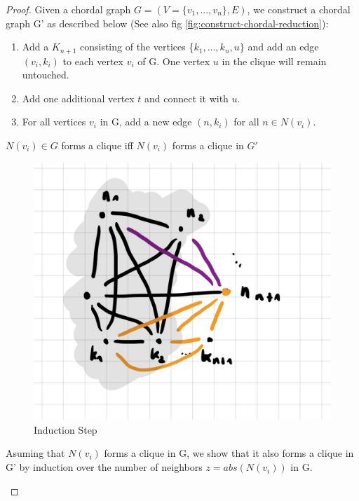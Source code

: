\begin{proof}
    

    Given a chordal graph $G = (V = \{v_1,...,v_n\}, E)$, we construct a chordal graph G' as described below (See also fig \ref{fig:construct-chordal-reduction}):
    \begin{enumerate}
        \item Add a $K_{n+1}$ consisting of the vertices \{$k_1,...,k_n,u\}$ and add an edge $(v_i, k_i)$ to each vertex $v_i$ of G. One vertex $u$ in the clique will remain untouched.
        \item Add one additional vertex $t$ and connect it with $u$.
        \item For all vertices $v_i$ in G, add a new edge $(n, k_i)$ for all $n \in N(v_i)$.
    \end{enumerate}



    \begin{corollary}\label{cliqueNeighbor}
       $N(v_i) \in G$ forms a clique iff $N(v_i)$ forms a clique in $G'$
    \end{corollary}

    \begin{subproof}

\begin{figure}[th]
    \includegraphics[scale=0.15]{pages/img/induction-step.jpg}
    \centering
    \caption{Induction Step}
    \label{fig:induction-step}
\end{figure}
        Asuming that $N(v_i)$ forms a clique in G, we show that it also forms a clique in G' by induction over the number of neighbors $z = abs(N(v_i))$ in G.


\end{subproof}
\end{proof}

